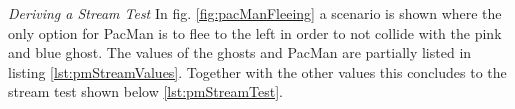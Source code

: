 \emph{Deriving a Stream Test} \newline
In fig. \ref{fig:pacManFleeing} a scenario is shown where the only option for PacMan is to flee to the left in order to not collide with the pink and blue ghost. The values of the ghosts and PacMan are partially listed in listing \ref{lst:pmStreamValues}. Together with the other values this concludes to the stream test shown below \ref{lst:pmStreamTest}.
\begin{figure}[!h]
	\centering

\end{figure}
